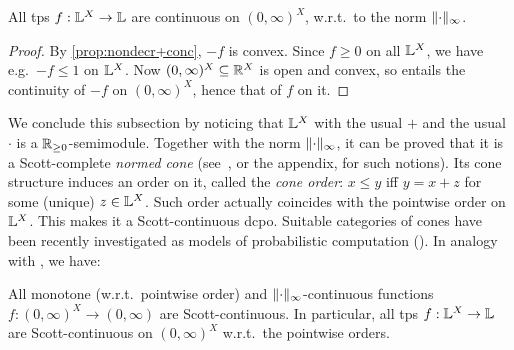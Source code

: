 \begin{theorem}\label{thm:cont}
 All tps $f:\mathbb{L}^X\to\mathbb{L}$ are continuous on $(0,\infty)^X$, w.r.t.\ to the norm $\lVert\cdot\rVert_\infty$.
\end{theorem}
\begin{proof}
By \autoref{prop:nondecr+conc}, $-f$ is convex.
Since $f\geq 0$ on all $\mathbb{L}^X$, we have e.g.\ $-f\leq 1$ on $\mathbb{L}^X$.
Now $(0,\infty)^X\subseteq \mathbb{R}^X$ is open and convex, %
so \cite[Proposition 4.4.(3)]{Cobzas2017} entails the continuity of $-f$ on $(0,\infty)^X$, hence that of $f$ on it.
\end{proof}

We conclude this subsection by noticing that $\mathbb{L}^X$ with the usual $+$ and the usual $\cdot$ is a $\mathbb{R}_{\geq0}$-semimodule.
Together with the norm $\lVert\cdot\rVert_\infty$, it can be proved that it is a Scott-complete \emph{normed cone} (see~\cite{Selinger2004}, or the appendix, for such notions).
Its cone structure induces an order on it, called the \emph{cone order}:
$x\leq y$ iff $y=x+z$ for some (unique) $z\in\mathbb{L}^X$.
Such order actually coincides with the pointwise order on $\mathbb{L}^X$.
This makes it a Scott-continuous dcpo.
Suitable categories of cones have been recently investigated as models of probabilistic computation (\cite{Crubillie2018, EhrPagTas2018, Ehrhard2020}).
In analogy with \cite[Proposition 17]{DanEhrh2011}, we have:

\begin{theorem}\label{thm:ScottCont}
 All monotone (w.r.t.\ pointwise order) and $\lVert\cdot\rVert_{\infty}$-continuous functions $f:(0,\infty)^X\to (0,\infty)$ are Scott-continuous.
 In particular, all tps $f:\mathbb{L}^X\to\mathbb{L}$ are Scott-continuous on $(0,\infty)^X$ w.r.t.\ the pointwise orders.
\end{theorem}



